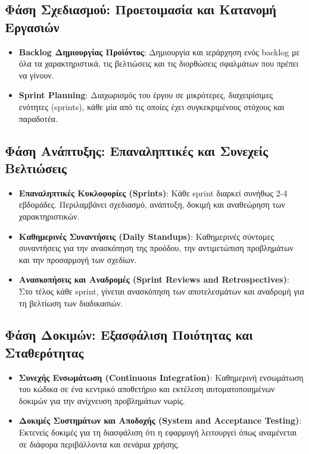 \documentclass{article}
\begin{document}
\subsection{Φάση Σχεδιασμού: Προετοιμασία και Κατανομή Εργασιών}
\begin{itemize}
    \item \textbf{Backlog Δημιουργίας Προϊόντος}: Δημιουργία και ιεράρχηση ενός backlog με όλα τα χαρακτηριστικά, τις βελτιώσεις και τις διορθώσεις σφαλμάτων που πρέπει να γίνουν.
    \item \textbf{Sprint Planning}: Διαχωρισμός του έργου σε μικρότερες, διαχειρίσιμες ενότητες (sprints), κάθε μία από τις οποίες έχει συγκεκριμένους στόχους και παραδοτέα.
\end{itemize}

\subsection{Φάση Ανάπτυξης: Επαναληπτικές και Συνεχείς Βελτιώσεις}
\begin{itemize}
    \item \textbf{Επαναληπτικές Κυκλοφορίες (Sprints)}: Κάθε sprint διαρκεί συνήθως 2-4 εβδομάδες. Περιλαμβάνει σχεδιασμό, ανάπτυξη, δοκιμή και αναθεώρηση των χαρακτηριστικών.
    \item \textbf{Καθημερινές Συναντήσεις (Daily Standups)}: Καθημερινές σύντομες συναντήσεις για την ανασκόπηση της προόδου, την αντιμετώπιση προβλημάτων και την προσαρμογή των σχεδίων.
    \item \textbf{Ανασκοπήσεις και Αναδρομές (Sprint Reviews and Retrospectives)}: Στο τέλος κάθε sprint, γίνεται ανασκόπηση των αποτελεσμάτων και αναδρομή για τη βελτίωση των διαδικασιών.
\end{itemize}

\subsection{Φάση Δοκιμών: Εξασφάλιση Ποιότητας και Σταθερότητας}
\begin{itemize}
    \item \textbf{Συνεχής Ενσωμάτωση (Continuous Integration)}: Καθημερινή ενσωμάτωση του κώδικα σε ένα κεντρικό αποθετήριο και εκτέλεση αυτοματοποιημένων δοκιμών για την ανίχνευση προβλημάτων νωρίς.
    \item \textbf{Δοκιμές Συστημάτων και Αποδοχής (System and Acceptance Testing)}: Εκτενείς δοκιμές για τη διασφάλιση ότι η εφαρμογή λειτουργεί όπως αναμένεται σε διάφορα περιβάλλοντα και σενάρια χρήσης.
\end{itemize}
\end{document}
